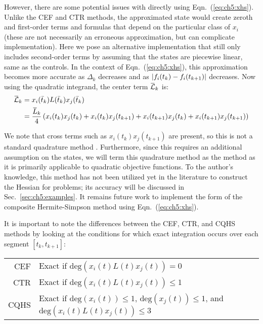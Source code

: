 \noindent However, there are some potential issues with directly using Eqn.~(\ref{eq:ch5:xhs}).
Unlike the CEF and CTR methods, the approximated state would create zeroth and first-order terms and formulas that depend on the particular class of $x_i$ (these are not necessarily an erroneous approximation, but can complicate implementation).
Here we pose an alternative implementation that still only includes second-order terms by assuming that the states are piecewise linear, same as the controls.
In the context of Eqn.~(\ref{eq:ch5:xhs}), this approximation becomes more accurate as $\Delta_k$ decreases and as $\lvert{f}_{i}(t_k) - {f}_{i}(t_{k+1})\rvert$ decreases.
Now using the quadratic integrand, the center term $\myoverbar{\mathcal{L}}_k$ is: 
\begin{subequations}
\begin{align}
\myoverbar{\mathcal{L}}_k &= x_i(\bar{t}_k) L(\bar{t}_k) x_j(\bar{t}_k) \\
&= \frac{\myoverbar{L}_{k}}{4}  \left( x_i(t_{k}) x_j(t_{k}) + x_i(t_{k}) x_j(t_{k+1}) + x_i(t_{k+1}) x_j(t_{k}) + x_i(t_{k+1}) x_j(t_{k+1}) \right)
\end{align}
\end{subequations}

\noindent We note that cross terms such as $x_i(t_{k}) x_j(t_{k+1})$ are present, so this is not a standard quadrature method \cite{Heath2002a}.
Furthermore, since this requires an additional assumption on the states, we will term this quadrature method as the  method as it is primarily applicable to quadratic objective functions.
To the author's knowledge, this method has not been utilized yet in the literature to construct the Hessian for \lqdo{} problems; its accuracy will be discussed in Sec.~\ref{sec:ch5:examples}.
It remains future work to implement the \qp{} form of the composite Hermite-Simpson method using Eqn.~(\ref{eq:ch5:xhs}). 

It is important to note the differences between the CEF, CTR, and CQHS methods by looking at the conditions for which exact integration occurs over each segment $[t_k,t_{k+1}]$: 
\begin{center}
\begin{tabular}{ r l }
  CEF & Exact if $\mathrm{deg}\left( x_i(t) L(t) x_j(t) \right) = 0$ \\
  CTR & Exact if $\mathrm{deg}\left( x_i(t) L(t) x_j(t) \right) \leq 1$ \\
  CQHS & Exact if $\mathrm{deg}\left( x_i(t) \right) \leq 1$, $\mathrm{deg}\left( x_j(t) \right) \leq 1$, and $\mathrm{deg}\left( x_i(t) L(t) x_j(t) \right) \leq 3$
\end{tabular}
\end{center}

